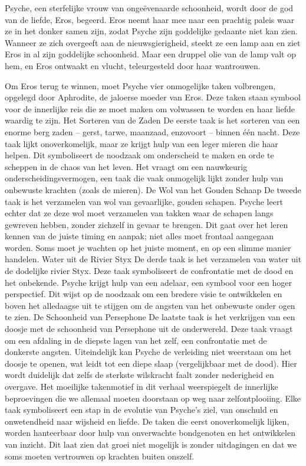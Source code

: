 Psyche, een sterfelijke vrouw van ongeëvenaarde schoonheid, wordt door de god van de liefde, Eros, begeerd. Eros neemt haar mee naar een prachtig paleis waar ze in het donker samen zijn, zodat Psyche zijn goddelijke gedaante niet kan zien. Wanneer ze zich overgeeft aan de nieuwsgierigheid, steekt ze een lamp aan en ziet Eros in al zijn goddelijke schoonheid. Maar een druppel olie van de lamp valt op hem, en Eros ontwaakt en vlucht, teleurgesteld door haar wantrouwen.

Om Eros terug te winnen, moet Psyche vier onmogelijke taken volbrengen, opgelegd door Aphrodite, de jaloerse moeder van Eros. Deze taken staan symbool voor de innerlijke reis die ze moet maken om volwassen te worden en haar liefde waardig te zijn.
Het Sorteren van de Zaden
De eerste taak is het sorteren van een enorme berg zaden – gerst, tarwe, maanzaad, enzovoort – binnen één nacht. Deze taak lijkt onoverkomelijk, maar ze krijgt hulp van een leger mieren die haar helpen. Dit symboliseert de noodzaak om onderscheid te maken en orde te scheppen in de chaos van het leven. Het vraagt om een nauwkeurig onderscheidingsvermogen, een taak die vaak onmogelijk lijkt zonder hulp van onbewuste krachten (zoals de mieren).
De Wol van het Gouden Schaap
De tweede taak is het verzamelen van wol van gevaarlijke, gouden schapen. Psyche leert echter dat ze deze wol moet verzamelen van takken waar de schapen langs gewreven hebben, zonder zichzelf in gevaar te brengen. Dit gaat over het leren kennen van de juiste timing en aanpak; niet alles moet frontaal aangegaan worden. Soms moet je wachten op het juiste moment, en op een slimme manier handelen.
Water uit de Rivier Styx
De derde taak is het verzamelen van water uit de dodelijke rivier Styx. Deze taak symboliseert de confrontatie met de dood en het onbekende. Psyche krijgt hulp van een adelaar, een symbool voor een hoger perspectief. Dit wijst op de noodzaak om een bredere visie te ontwikkelen en boven het alledaagse uit te stijgen om de angsten van het onbewuste onder ogen te zien.
De Schoonheid van Persephone
De laatste taak is het verkrijgen van een doosje met de schoonheid van Persephone uit de onderwereld. Deze taak vraagt om een afdaling in de diepste lagen van het zelf, een confrontatie met de donkerste angsten. Uiteindelijk kan Psyche de verleiding niet weerstaan om het doosje te openen, wat leidt tot een diepe slaap (vergelijkbaar met de dood). Hier wordt duidelijk dat zelfs de sterkste wilskracht faalt zonder nederigheid en overgave.
Het moeilijke takenmotief in dit verhaal weerspiegelt de innerlijke beproevingen die we allemaal moeten doorstaan op weg naar zelfontplooiing. Elke taak symboliseert een stap in de evolutie van Psyche's ziel, van onschuld en onwetendheid naar wijsheid en liefde. De taken die eerst onoverkomelijk lijken, worden hanteerbaar door hulp van onverwachte bondgenoten en het ontwikkelen van inzicht. Dit laat zien dat groei niet mogelijk is zonder uitdagingen en dat we soms moeten vertrouwen op krachten buiten onszelf.

